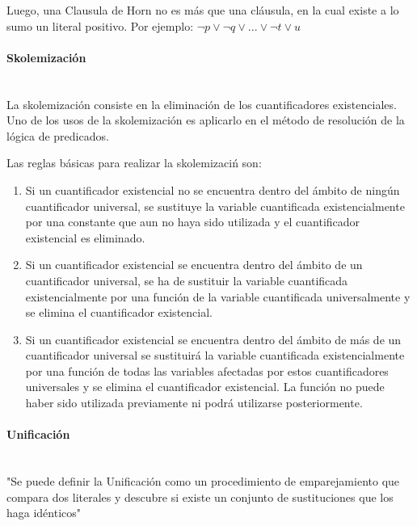 \documentclass{article}
\begin{document}
Luego, una Clausula de Horn no es m\'as que una cl\'ausula, en la cual existe a lo sumo un literal positivo. Por ejemplo: $ \neg p \lor \neg q \lor ... \lor \neg t \lor u$ 

\paragraph{Skolemizaci\'on}\mbox{}\\

La skolemizaci\'on consiste en la eliminaci\'on de los cuantificadores existenciales.
Uno de los usos de la skolemizaci\'on es aplicarlo en el m\'etodo de resoluci\'on de la l\'ogica de predicados.

 Las reglas básicas para realizar la skolemizaci\'n son:
\begin{enumerate}

\item Si un cuantificador existencial no se encuentra dentro del \'ambito de ning\'un cuantificador universal, se sustituye la variable cuantificada existencialmente por una constante que aun no haya sido utilizada y el cuantificador existencial es eliminado.

\item Si un cuantificador existencial se encuentra dentro del \'ambito de un cuantificador universal, se ha de sustituir la variable cuantificada existencialmente por una funci\'on de la variable cuantificada universalmente y se elimina el cuantificador existencial.
	
\item Si un cuantificador existencial se encuentra dentro del \'ambito de más de un cuantificador universal se sustituir\'a la variable cuantificada existencialmente por una funci\'on de todas las variables afectadas por estos cuantificadores universales y se elimina el cuantificador existencial. La funci\'on no puede haber sido utilizada previamente ni podr\'a utilizarse posteriormente.

\end{enumerate}

\paragraph{Unificaci\'on}\mbox{}\\

"Se puede definir la Unificación como un procedimiento de emparejamiento que compara dos literales y descubre si existe un conjunto de sustituciones que los haga id\'enticos"
\end{document}
